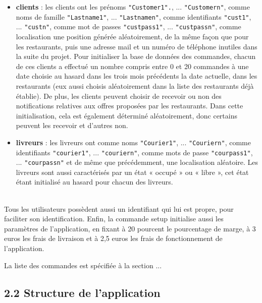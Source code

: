 \begin{itemize}
    \item \textbf{clients} : les clients ont les prénoms \texttt{"Customer1".}, ... \texttt{"Customern"}, comme noms de famille \texttt{"Lastname1"}, ... \texttt{"Lastnamen"}, comme identifiants \texttt{"cust1"}, ... \texttt{"custn"}, comme mot de passes \texttt{"custpass1"}, ... \texttt{"custpassn"}, comme localisation une position générée aléatoirement, de la même façon que pour les restaurants, puis une adresse mail et un numéro de téléphone inutiles dans la suite du projet. Pour initialiser la base de données des commandes, chacun de ces clients a effectué un nombre compris entre 0 et 20 commandes à une date choisie au hasard dans les trois mois précédents la date actuelle, dans les restaurants (eux aussi choisis aléatoirement dans la liste des restaurants déjà établie). De plus, les clients peuvent choisir de recevoir ou non des notifications relatives aux offres proposées par les restaurants. Dans cette initialisation, cela est également déterminé aléatoirement, donc certains peuvent les recevoir et d'autres non.\\ 
    \item \textbf{livreurs} : les livreurs ont comme noms \texttt{"Courier1"}, ... \texttt{"Couriern"}, comme identifiants \texttt{"courier1"}, ... \texttt{"couriern"}, comme mots de passe \texttt{"courpass1"}, ... \texttt{"courpassn"} et de même que précédemment, une localisation aléatoire. Les livreurs sont aussi caractérisés par un état « occupé » ou « libre », cet état étant initialisé au hasard pour chacun des livreurs. \\
\end{itemize}\\

Tous les utilisateurs possèdent aussi un identifiant qui lui est propre, pour faciliter son identification. Enfin, la commande setup initialise aussi les paramètres de l'application, en fixant à 20 pourcent le pourcentage de marge, à 3 euros les frais de livraison et à 2,5 euros les frais de fonctionnement de l'application. 

La liste des commandes est spécifiée à la section ...

\subsection*{2.2 Structure de l'application}

